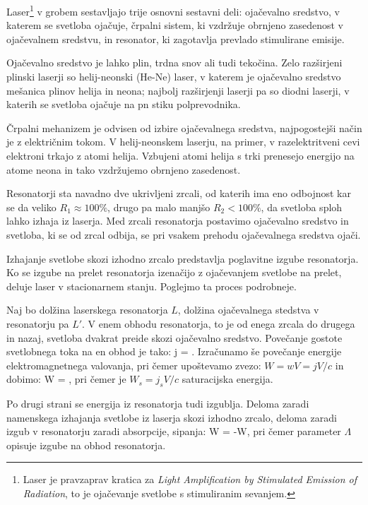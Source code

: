 Laser\footnote{Laser je pravzaprav kratica za {\it Light Amplification by Stimulated
Emission of Radiation}, to je ojačevanje svetlobe s stimuliranim sevanjem.} 
v grobem sestavljajo trije osnovni sestavni deli: ojačevalno sredstvo, 
v katerem se svetloba ojačuje, črpalni sistem, ki vzdržuje obrnjeno zasedenost
v ojačevalnem sredstvu, in resonator, ki zagotavlja prevlado stimulirane emisije.

Ojačevalno sredstvo je lahko plin, trdna snov ali tudi tekočina. Zelo razširjeni
plinski laserji so helij-neonski (He-Ne) laser, v katerem je ojačevalno sredstvo
mešanica plinov helija in neona; najbolj razširjenji laserji pa so diodni laserji,
v katerih se svetloba ojačuje na pn stiku polprevodnika. 

Črpalni mehanizem je odvisen od izbire ojačevalnega sredstva, najpogostejši način je 
z električnim tokom. V helij-neonskem laserju, na primer, v razelektritveni 
cevi elektroni trkajo z atomi helija. Vzbujeni atomi helija s trki prenesejo 
energijo na atome neona in tako vzdržujemo obrnjeno zasedenost. 

Resonatorji sta navadno dve ukrivljeni zrcali, od katerih ima eno odbojnost
kar se da veliko $R_1 \approx 100\%$, drugo pa malo manjšo $R_2 < 100\%$, 
da svetloba sploh lahko izhaja iz laserja. Med zrcali resonatorja postavimo
ojačevalno sredstvo in svetloba, ki se od zrcal odbija, se pri vsakem prehodu
ojačevalnega sredstva ojači.

Izhajanje svetlobe skozi izhodno zrcalo predstavlja poglavitne izgube resonatorja. 
Ko se izgube na prelet resonatorja izenačijo z ojačevanjem svetlobe na prelet, deluje
laser v stacionarnem stanju. Poglejmo ta proces podrobneje.

Naj bo dolžina laserskega resonatorja $L$, dolžina ojačevalnega stedstva v resonatorju pa $L'$. V enem 
obhodu resonatorja, to je od enega zrcala do drugega in nazaj, svetloba dvakrat preide skozi ojačevalno
sredstvo. Povečanje gostote svetlobnega toka na en obhod je tako:
\beq
\Delta j = .
\eeq
Izračunamo še povečanje energije elektromagnetnega valovanja, pri čemer upoštevamo zvezo:
$W = wV = jV/c$ in dobimo:
\beq
\Delta W = ,
\eeq
pri čemer je $W_s = j_s V/c$ saturacijska energija. 

Po drugi strani se energija iz resonatorja tudi izgublja. Deloma zaradi namenskega izhajanja
svetlobe iz laserja skozi izhodno zrcalo, deloma zaradi izgub v resonatorju zaradi absorpcije, sipanja:
\beq
\Delta W = -\Lambda W,
\eeq
pri čemer parameter $\Lambda$ opisuje izgube na obhod resonatorja.

